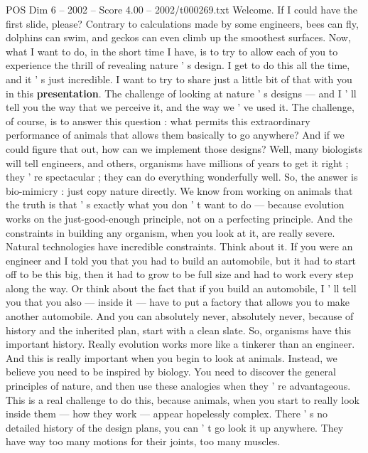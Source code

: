 \begin{textsample}{POS Dim 6 – 2002 – Score 4.00 – 2002/t000269.txt}  \label{ex:f6_pos_006}
Welcome.
If I could have the first slide, please?
Contrary to calculations made by some engineers, bees can fly, dolphins can swim, and geckos can even climb up the smoothest surfaces.
Now, what I want to do, in the short time I have, is to try to allow each of you to experience the thrill of revealing nature ' s design.
I get to do this all the time, and it ' s just incredible.
I want to try to share just a little bit of that with you in this \textbf{presentation}.
The challenge of looking at nature ' s designs — and I ' ll tell you the way that we perceive it, and the way we ' ve used it.
The challenge, of course, is to answer this question : what permits this extraordinary performance of animals that allows them basically to go anywhere?
And if we could figure that out, how can we implement those designs?
Well, many biologists will tell engineers, and others, organisms have millions of years to get it right ; they ' re spectacular ; they can do everything wonderfully well.
So, the answer is bio-mimicry : just copy nature directly.
We know from working on animals that the truth is that ' s exactly what you don ' t want to do — because evolution works on the just-good-enough principle, not on a perfecting principle.
And the constraints in building any organism, when you look at it, are really severe.
Natural technologies have incredible constraints.
Think about it.
If you were an engineer and I told you that you had to build an automobile, but it had to start off to be this big, then it had to grow to be full size and had to work every step along the way.
Or think about the fact that if you build an automobile, I ' ll tell you that you also — inside it — have to put a factory that allows you to make another automobile.
And you can absolutely never, absolutely never, because of history and the inherited plan, start with a clean slate.
So, organisms have this important history.
Really evolution works more like a tinkerer than an engineer.
And this is really important when you begin to look at animals.
Instead, we believe you need to be inspired by biology.
You need to discover the general principles of nature, and then use these analogies when they ' re advantageous.
This is a real challenge to do this, because animals, when you start to really look inside them — how they work — appear hopelessly complex.
There ' s no detailed history of the design plans, you can ' t go look it up anywhere.
They have way too many motions for their joints, too many muscles.

\end{textsample}
